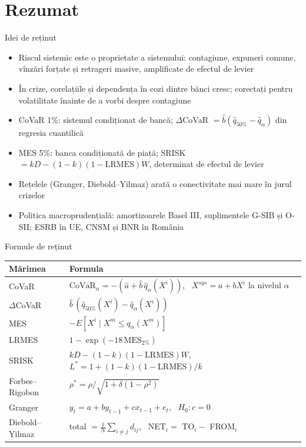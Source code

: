 \section{Rezumat}

\begin{frame}{Idei de reținut}
\itemsize{\small}
\begin{itemize}
    \item Riscul sistemic este o proprietate a sistemului: contagiune, expuneri comune, vînzări forțate și retrageri masive, amplificate de efectul de levier
    \item În crize, corelațiile și dependența în cozi dintre bănci cresc; corectați pentru volatilitate înainte de a vorbi despre contagiune
    \item CoVaR 1\%: sistemul condiționat de bancă; $\Delta$CoVaR $= \hat b(\hat q_{50\%} - \hat q_\alpha)$ din regresia cuantilică
    \item MES 5\%: banca condiționată de piață; SRISK $= kD - (1 - k)(1 - \mathrm{LRMES})W$, determinat de efectul de levier
    \item Rețelele (Granger, Diebold--Yilmaz) arată o conectivitate mai mare în jurul crizelor
    \item Politica macroprudențială: amortizoarele Basel III, suplimentele G-SIB și O-SII; ESRB în UE, CNSM și BNR în România
\end{itemize}
\end{frame}

\begin{frame}{Formule de reținut}
\itemsize{\small}
{\renewcommand{\arraystretch}{1.45}\begin{center}
\scriptsize
\begin{tabular}{ll}
\toprule
\textbf{Mărimea} & \textbf{Formula} \\
\midrule
CoVaR & $\mathrm{CoVaR}_\alpha = -(\hat a + \hat b\,\hat q_\alpha(X^i))$, \ $X^{sys} = a + bX^i$ la nivelul $\alpha$ \\
$\Delta$CoVaR & $\hat b\,(\hat q_{50\%}(X^i) - \hat q_\alpha(X^i))$ \\
MES & $-E[X^i \mid X^m \le q_\alpha(X^m)]$ \\
LRMES & $1 - \exp(-18\,\mathrm{MES}_{2\%})$ \\
SRISK & $kD - (1 - k)(1 - \mathrm{LRMES})W$, \ $L^* = 1 + (1 - k)(1 - \mathrm{LRMES})/k$ \\
Forbes--Rigobon & $\rho^* = \rho/\sqrt{1 + \delta(1 - \rho^2)}$ \\
Granger & $y_t = a + by_{t-1} + cx_{t-1} + e_t$, \ $H_0: c = 0$ \\
Diebold--Yilmaz & total $= \frac1N\sum_{i \ne j} d_{ij}$, \ NET$_i = $ TO$_i - $ FROM$_i$ \\
\bottomrule
\end{tabular}
\end{center}
}
\end{frame}


